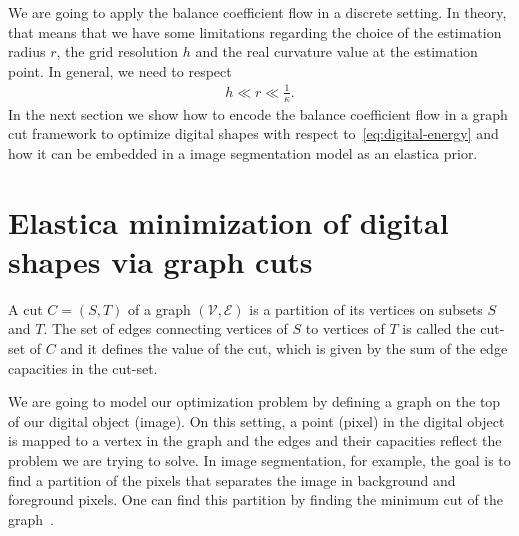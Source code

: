 \documentclass{siamart220329}
\begin{document}
We are going to apply the balance coefficient flow in a discrete setting. In
theory, that means that we have some limitations regarding the choice of the
estimation radius $r$, the grid resolution $h$ and the real curvature value at
the estimation point. In general, we need to respect
%
%
\begin{align*}
	h \ll r \ll \frac{1}{\kappa}.
\end{align*}
%
%
In the next section we show how to encode the balance
coefficient flow in a graph cut framework to optimize digital shapes with
respect to~\cref{eq:digital-energy} and how it can be embedded in a image
segmentation model as an elastica prior. 
%
% 
%
%
%
%
%
%
\section{Elastica minimization of digital shapes via graph cuts}

A cut $C=(S,T)$ of a graph
$(\mathcal{V},\mathcal{E})$ is a partition of its vertices on subsets $S$ and
$T$. The set of edges connecting vertices of $S$ to vertices of $T$ is called
the cut-set of $C$ and it defines the value of the cut, which is given by the
sum of the edge capacities in the cut-set. 

We are going to model our optimization problem by defining a
graph on the top of our digital object (image). On this setting, a point
(pixel) in the digital object is mapped to a vertex in the graph and the edges
and their capacities reflect the problem we are trying to solve. In image
segmentation, for example, the goal is to find a partition of the pixels that
separates the image in background and foreground pixels. One can find this
partition by finding the minimum cut of the graph~\cite{boykov01graphcut}.
\end{document}
